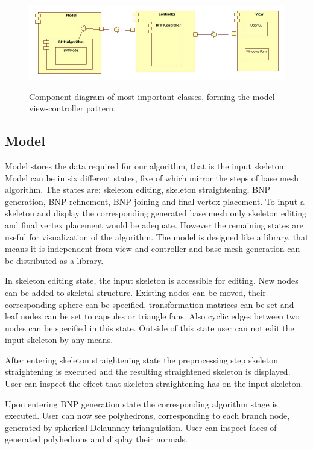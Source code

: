 \begin{figure}[h]
    \centering
    \includegraphics[width=\textwidth]{images/classes}
    \label{fig:classes}
    \caption[Component diagram of classes]{Component diagram of most important classes, forming the model-view-controller pattern.}
\end{figure}

\subsection{Model}

Model stores the data required for our algorithm, that is the input skeleton.
Model can be in six different states, five of which mirror the steps of base mesh algorithm.
The states are: skeleton editing, skeleton straightening, BNP generation, BNP refinement, BNP joining and final vertex placement.
To input a skeleton and display the corresponding generated base mesh only skeleton editing and final vertex placement would be adequate.
However the remaining states are useful for visualization of the algorithm.
The model is designed like a library, that means it is independent from view and controller and base mesh generation can be distributed as a library.

In skeleton editing state, the input skeleton is accessible for editing.
New nodes can be added to skeletal structure.
Existing nodes can be moved, their corresponding sphere can be specified, transformation matrices can be set and leaf nodes can be set to capsules or triangle fans.
Also cyclic edges between two nodes can be specified in this state.
Outside of this state user can not edit the input skeleton by any means.

After entering skeleton straightening state the preprocessing step skeleton straightening is executed and the resulting straightened skeleton is displayed.
User can inspect the effect that skeleton straightening has on the input skeleton.

Upon entering BNP generation state the corresponding algorithm stage is executed.
User can now see polyhedrons, corresponding to each branch node, generated by spherical Delaunnay triangulation.
User can inspect faces of generated polyhedrons and display their normals.

